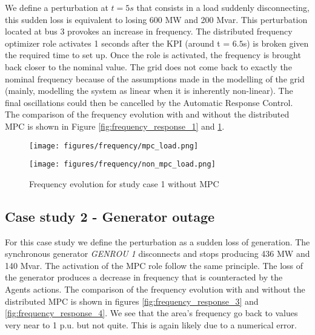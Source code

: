 \documentclass{article}
\begin{document}
We define a perturbation at $t=5s$ that consists in a load suddenly disconnecting, this sudden loss is equivalent to losing 600 MW and 200 Mvar. This perturbation located at bus 3 provokes an increase in frequency. The distributed frequency optimizer role activates 1 seconds after the KPI (around t = $6.5$s) is broken given the required time to set up. Once the role is activated, the frequency is brought back closer to the nominal value. The grid does not come back to exactly the nominal frequency because of the assumptions made in the modelling of the grid (mainly, modelling the system as linear when it is inherently non-linear). The final oscillations could then be cancelled by the Automatic Response Control. The comparison of the frequency evolution with and without the distributed MPC is shown in Figure \ref{fig:frequency_response_1} and \ref{fig:frequency_response_2}.

\begin{figure}[H]
    \centering

    \begin{minipage}{0.7\textwidth}
        \centering
        \texttt{[image: figures/frequency/mpc\_load.png]}
        \caption{Frequency evolution for study case 1 with MPC}
        \label{fig:frequency_response_1}
    \end{minipage}

    \vspace{0.5cm}  %

    \begin{minipage}{0.7\textwidth}
        \centering
        \texttt{[image: figures/frequency/non\_mpc\_load.png]}
        \caption{Frequency evolution for study case 1 without MPC}
        \label{fig:frequency_response_2}
    \end{minipage}

\end{figure}

\subsection{Case study 2 - Generator outage}

For this case study we define the perturbation as a sudden loss of generation. The synchronous generator \textit{GENROU 1} disconnects and stops producing 436 MW and 140 Mvar. The activation of the MPC role follow the same principle. The loss of the generator produces a decrease in frequency that is counteracted by the Agents actions. The comparison of the frequency evolution with and without the distributed MPC is shown in figures  \ref{fig:frequency_response_3} and \ref{fig:frequency_response_4}. We see that the area's frequency go back to values very near to 1 p.u. but not quite. This is again likely due to a numerical error.
\end{document}
